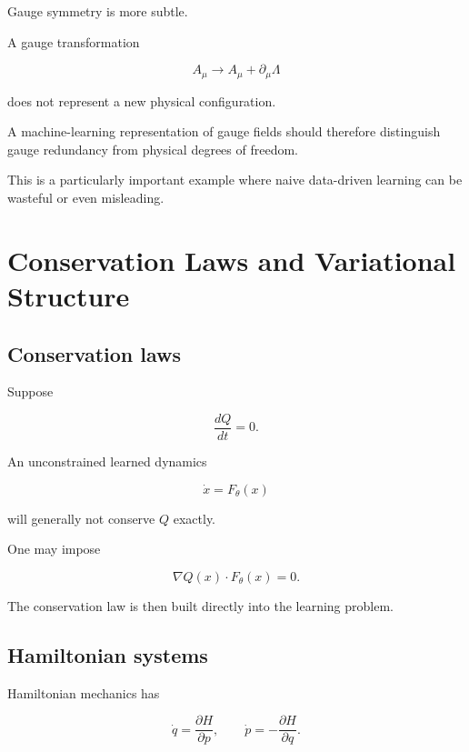 \documentclass[11pt,a4paper,oneside]{book}
\begin{document}
Gauge symmetry is more subtle.

A gauge transformation

\begin{equation}
A_\mu
\rightarrow
A_\mu+\partial_\mu\Lambda
\end{equation}

does not represent a new physical configuration.

A machine-learning representation of gauge fields should therefore distinguish
gauge redundancy from physical degrees of freedom.

This is a particularly important example where naive data-driven learning can
be wasteful or even misleading.

\chapter{Conservation Laws and Variational Structure}

\section{Conservation laws}

Suppose

\begin{equation}
\frac{dQ}{dt}=0.
\end{equation}

An unconstrained learned dynamics

\begin{equation}
\dot{x}=F_\theta(x)
\end{equation}

will generally not conserve $Q$ exactly.

One may impose

\begin{equation}
\nabla Q(x)\cdot F_\theta(x)=0.
\end{equation}

The conservation law is then built directly into the learning problem.

\section{Hamiltonian systems}

Hamiltonian mechanics has

\begin{equation}
\dot{q}
=
\frac{\partial H}{\partial p},
\qquad
\dot{p}
=
-\frac{\partial H}{\partial q}.
\end{equation}
\end{document}
